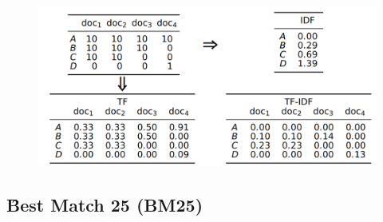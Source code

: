     
    \begin{figure}[!ht]
        \centering
        \includegraphics[width=1\textwidth]{assets/pics/tf-idf-matriks.png}
        \label{fig:tf-idf-matriks}
    \end{figure}
    \subsection{\f{Best Match 25} (BM25)}
    \label{sec:bm25}
    
